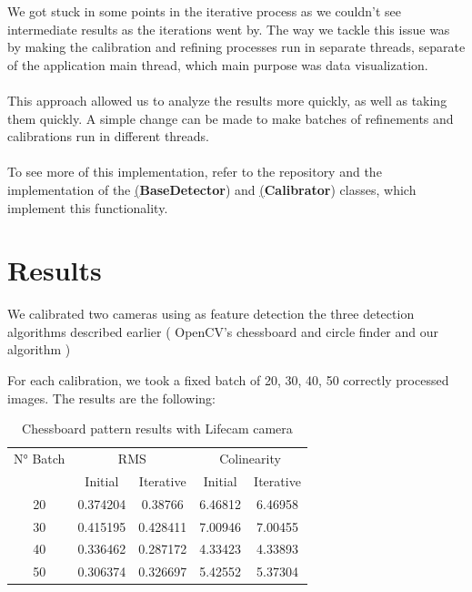 \documentclass[journal]{IEEEtran}
\begin{document}
We got stuck in some points in the iterative process as we couldn't see intermediate results as the iterations went by. The way we tackle this issue was by making the calibration and refining processes run in separate threads, separate of the application main thread, which main purpose was data visualization.
\\
\\
This approach allowed us to analyze the results more quickly, as well as taking them quickly. A simple change can be made to make batches of refinements and calibrations run in different threads.
\\
\\
To see more of this implementation, refer to the repository and the implementation of the \href{https://github.com/wpumacay/calibcv/blob/dev/calibration/calibrationBaseDetector.cpp}(\textbf{BaseDetector}) and \href{https://github.com/wpumacay/calibcv/blob/dev/calibration/calibrationTool.h}(\textbf{Calibrator}) classes, which implement this functionality.

\section{Results}
We calibrated two cameras using as feature detection the three detection algorithms described earlier ( OpenCV's chessboard and circle finder and our algorithm )

For each calibration, we took a fixed batch of 20, 30, 40, 50 correctly processed images. The results are the following:

\begin{table}[h]
\centering
\caption{Chessboard pattern results with Lifecam camera}
\begin{tabular}{ |c||c|c|c|c|  }
 \hline
 N° Batch & \multicolumn{2}{c|}{RMS} & \multicolumn{2}{c|}{Colinearity}\\
 \cline{2-5}
 & Initial & Iterative & Initial & Iterative \\
 \hline
 20        & 0.374204 & 0.38766 & 6.46812 & 6.46958 \\
 30        & 0.415195 & 0.428411 & 7.00946 & 7.00455 \\
 40        & 0.336462 & 0.287172 & 4.33423 & 4.33893 \\
 50        & 0.306374 & 0.326697 & 5.42552 & 5.37304 \\
 \hline
\end{tabular}
\\
\end{table}
\end{document}
